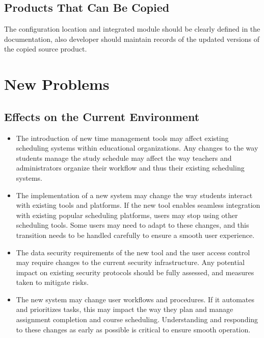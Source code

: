 \documentclass[12pt]{article}
\begin{document}
\subsection{Products That Can Be Copied}
The configuration location and integrated module should be clearly defined in the documentation, also developer should maintain records of the updated versions of the copied source product.\\


\section{New Problems}
\subsection{Effects on the Current Environment}

\begin{itemize}
    \item The introduction of new time management tools may affect existing scheduling systems within educational organizations. Any changes to the way students manage the study schedule may affect the way teachers and administrators organize their workflow and thus their existing scheduling systems.

    \item The implementation of a new system may change the way students interact with existing tools and platforms. If the new tool enables seamless integration with existing popular scheduling platforms, users may stop using other scheduling tools. Some users may need to adapt to these changes, and this transition needs to be handled carefully to ensure a smooth user experience.

    \item The data security requirements of the new tool and the user access control may require changes to the current security infrastructure. Any potential impact on existing security protocols should be fully assessed, and measures taken to mitigate risks.

    \item The new system may change user workflows and procedures. If it automates and prioritizes tasks, this may impact the way they plan and manage assignment completion and course scheduling. Understanding and responding to these changes as early as possible is critical to ensure smooth operation.
\end{itemize}
\end{document}
